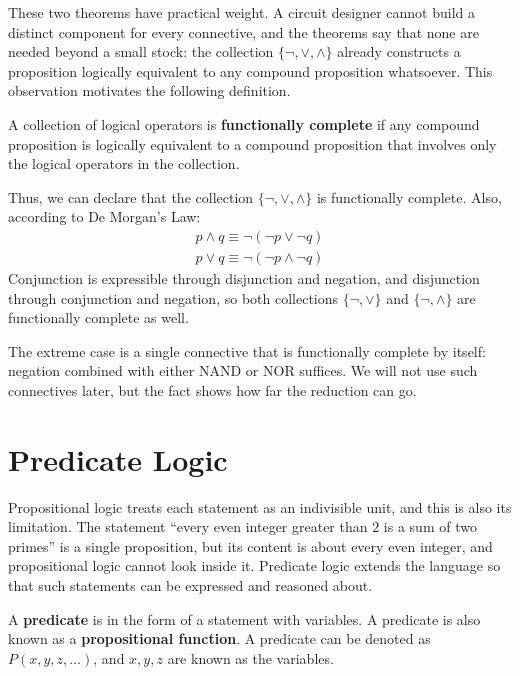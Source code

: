 These two theorems have practical weight. A circuit designer cannot build a distinct component for every connective, and the theorems say that none are needed beyond a small stock: the collection $\{\neg, \vee, \wedge\}$ already constructs a proposition logically equivalent to any compound proposition whatsoever. This observation motivates the following definition.

\begin{definition}
A collection of logical operators is \textbf{functionally complete} if any compound proposition is logically equivalent to a compound proposition that involves only the logical operators in the collection.
\end{definition}

Thus, we can declare that the collection $\{\neg, \vee, \wedge\}$ is functionally complete. Also, according to De Morgan’s Law:
\begin{align*}
    p \wedge q \equiv \neg(\neg p \vee \neg q) \\
    p \vee q \equiv \neg(\neg p \wedge \neg q)
\end{align*}
Conjunction is expressible through disjunction and negation, and disjunction through conjunction and negation, so both collections $\{\neg, \vee\}$ and $\{\neg, \wedge\}$ are functionally complete as well.

\begin{remark}
The extreme case is a single connective that is functionally complete by itself: negation combined with either NAND or NOR suffices. We will not use such connectives later, but the fact shows how far the reduction can go.
\end{remark}

\section{Predicate Logic}
Propositional logic treats each statement as an indivisible unit, and this is also its limitation. The statement “every even integer greater than $2$ is a sum of two primes” is a single proposition, but its content is about every even integer, and propositional logic cannot look inside it. Predicate logic extends the language so that such statements can be expressed and reasoned about.

\begin{definition}[Predicate]
A \textbf{predicate} is in the form of a statement with variables. A predicate is also known as a \textbf{propositional function}. A predicate can be denoted as $P(x, y, z, \dots)$, and $x, y, z$ are known as the variables.
\end{definition}

